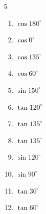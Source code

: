 \begin{multicols}{5}
\begin{enumerate}
        \phantom{$\displaystyle =-1$}

  \item $\displaystyle \cos{180^\circ}$

        \phantom{$\displaystyle =-1$}

  \item $\displaystyle \cos{0^\circ}$

        \phantom{$\displaystyle =1$}

\columnbreak %

  \item $\displaystyle \cos{135^\circ}$


  \item $\displaystyle \cos{60^\circ}$


  \item $\displaystyle \sin{150^\circ}$


  \item $\displaystyle \tan{120^\circ}$


  \item $\displaystyle \tan{135^\circ}$

        \phantom{$\displaystyle =-1$}

  \item $\displaystyle \tan{135^\circ}$

        \phantom{$\displaystyle =-1$}

  \item $\displaystyle \sin{120^\circ}$


  \item $\displaystyle \sin{90^\circ}$

        \phantom{$\displaystyle =1$}

  \item $\displaystyle \tan{30^\circ}$


  \item $\displaystyle \tan{60^\circ}$



\end{enumerate}
\end{multicols}
